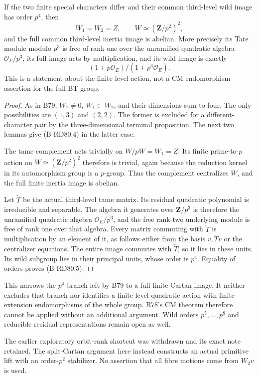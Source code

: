 \begin{theorem}
\label{thm:B-RD80}
If the two finite special characters differ and their common
third-level wild image has order \(p^4\), then
\[
 W_1=W_2=Z,
 \qquad W\simeq(\mathbf Z/p^2)^2,
                                                     \tag{B-RD80.4}
\]
and the full common third-level inertia image is abelian.
More precisely its Tate module modulo \(p^3\) is free of rank one
over the unramified quadratic algebra \(\mathcal O_E/p^3\),
its full image acts by multiplication, and its wild image is exactly
\[
                 (1+p\mathcal O_E)/(1+p^3\mathcal O_E).
                                                     \tag{B-RD80.5}
\]
This is a statement about the finite-level action, not a CM
endomorphism assertion for the full BT group.
\end{theorem}
\begin{proof}
As in B79, \(W_1\ne0\), \(W_1\subset W_2\), and their dimensions
sum to four. The only possibilities are \((1,3)\) and \((2,2)\).
The former is excluded for a different-character pair by the
three-dimensional terminal proposition. The next two lemmas give
(B-RD80.4) in the latter case.

The tame complement acts trivially on \(W/pW=W_1=Z\).
Its finite prime-to-\(p\) action on \(W\simeq(\mathbf Z/p^2)^2\)
therefore is trivial, again because the reduction kernel in its
automorphism group is a \(p\)-group. Thus the complement centralizes
\(W\), and the full finite inertia image is abelian.

Let \(\widetilde T\) be the actual third-level tame matrix.
Its residual quadratic polynomial is irreducible and separable.
The algebra it generates over \(\mathbf Z/p^3\) is therefore the
unramified quadratic algebra \(\mathcal O_E/p^3\), and the free
rank-two underlying module is free of rank one over that algebra.
Every matrix commuting with \(\widetilde T\) is multiplication
by an element of it, as follows either from the basis
\(v,\widetilde T v\) or the centralizer equations.
The entire image commutes with \(\widetilde T\), so it lies in
these units. Its wild subgroup lies in their principal units,
whose order is \(p^4\). Equality of orders proves (B-RD80.5).
\end{proof}

\begin{remark}
\label{rem:B-RD80-scope}
This narrows the \(p^4\) branch left by B79 to a full finite
Cartan image. It neither excludes that branch nor identifies a
finite-level quadratic action with finite-extension endomorphisms
of the whole group. B78's CM theorem therefore cannot be applied
without an additional argument. Wild orders \(p^5,\ldots,p^8\)
and reducible residual representations remain open as well.

The earlier exploratory orbit-rank shortcut was withdrawn and its
exact note retained. The split-Cartan argument here instead constructs
an actual primitive lift with an order-\(p^2\) stabilizer. No assertion
that all fibre motions come from \(W_2v\) is used.
\end{remark}

